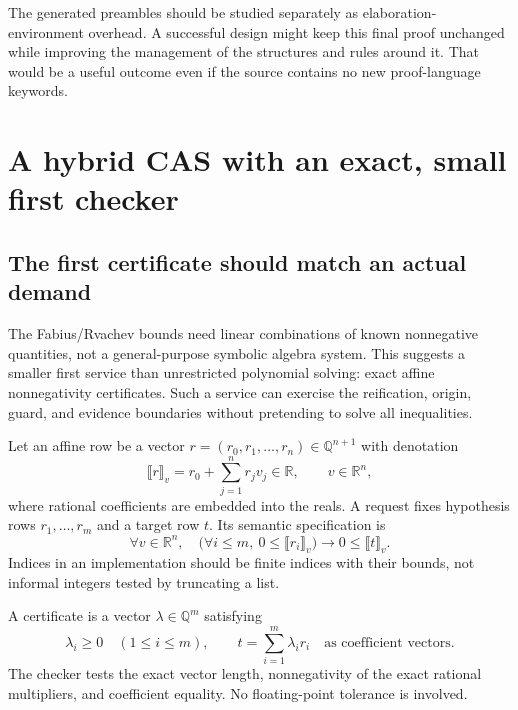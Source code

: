 \documentclass[11pt,a4paper]{article}
\theoremstyle{definition}
\theoremstyle{remark}
\newcommand{\R}{\mathbb R}
\newcommand{\Q}{\mathbb Q}
\newcommand{\den}[1]{\llbracket #1\rrbracket}
\begin{document}
The generated preambles should be studied separately as elaboration-environment overhead. A successful design might keep this final proof unchanged while improving the management of the structures and rules around it. That would be a useful outcome even if the source contains no new proof-language keywords.

\section{A hybrid CAS with an exact, small first checker}
\label{sec:cas}

\subsection{The first certificate should match an actual demand}
The Fabius/Rvachev bounds need linear combinations of known nonnegative quantities, not a general-purpose symbolic algebra system. This suggests a smaller first service than unrestricted polynomial solving: exact affine nonnegativity certificates. Such a service can exercise the reification, origin, guard, and evidence boundaries without pretending to solve all inequalities.

Let an affine row be a vector $r=(r_0,r_1,\ldots,r_n)\in\Q^{n+1}$ with denotation
\[
 \den r_v=r_0+\sum_{j=1}^n r_jv_j\in\R,
 \qquad v\in\R^n,
\]
where rational coefficients are embedded into the reals. A request fixes hypothesis rows $r_1,\ldots,r_m$ and a target row $t$. Its semantic specification is
\begin{equation}
 \forall v\in\R^n,\quad
 \bigl(\forall i\le m,\ 0\le\den{r_i}_v\bigr)
 \longrightarrow 0\le\den t_v.
\label{eq:affspec}
\end{equation}
Indices in an implementation should be finite indices with their bounds, not informal integers tested by truncating a list.

A certificate is a vector $\lambda\in\Q^m$ satisfying
\begin{equation}
 \lambda_i\ge0\quad(1\le i\le m),\qquad
 t=\sum_{i=1}^m\lambda_i r_i
 \quad\text{as coefficient vectors}.
\label{eq:affcert}
\end{equation}
The checker tests the exact vector length, nonnegativity of the exact rational multipliers, and coefficient equality. No floating-point tolerance is involved.
\end{document}
